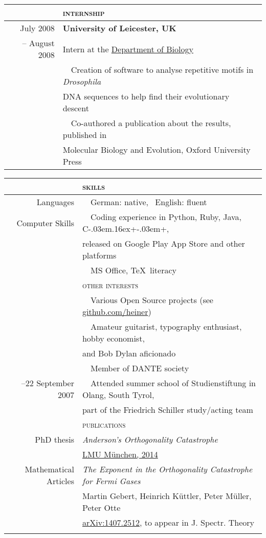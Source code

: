 \documentclass[11pt,english,a4paper]{memoir}
\newcommand{\red}{\color{Maroon}}
\newcommand{\header}[1]{%
  \addlinespace[2ex]
  & \large{\red\textsc{\MakeLowercase{#1}}} \tabularnewline
  \midrule}
\newcommand{\n}{\tabularnewline}
\newcommand{\bull}{\Pisymbol{MinionPro-Extra}{146}~~}
\newcommand{\nobull}{\phantom{\bull}}
\newcommand{\Cpp}{C\kern-.03em\raise.16ex\hbox{\small{+\kern-.03em+}}}
\begin{document}
\begin{center}
\begin{tabular}{rl}
  \n
  \header{Internship}
  July 2008       & \textbf{University of Leicester, UK} \n
  -- August 2008  & Intern at the \href{http://www.le.ac.uk/biology/phh4/}{Department of Biology} \n
  & \bull Creation of software to analyse repetitive motifs in
  \textit{Drosophila} \\
  & \nobull DNA sequences to help find their evolutionary descent \n
  & \bull Co-authored a publication about the results, published in \\
  & \nobull Molecular Biology and Evolution, Oxford University Press
\end{tabular}

\begin{tabular}{rl}
  \header{Skills}
  Languages & \bull German: native, \ English: fluent \n \addlinespace

  Computer Skills & \bull Coding experience in Python, Ruby, Java, \Cpp, \\
                  & \nobull released on Google Play App Store and other platforms \n
                  & \bull MS Office, \TeX\ literacy
  \n
  \header{Other interests}

  & \bull Various Open Source projects
  (see \href{https://github.com/heiner}{github.com/heiner}) \n
  & \bull Amateur guitarist, typography enthusiast,
  hobby economist,  \\
  & \nobull and Bob Dylan aficionado \n
  & \bull Member of DANTE society \n \addlinespace
  9--22 September 2007
  & \bull Attended summer school of Studienstiftung in Olang, South Tyrol, \\
  & \nobull part of the Friedrich Schiller study/acting team

  \n
  \header{Publications}
  PhD thesis & \textit{Anderson's Orthogonality Catastrophe} \\
  & \href{http://edoc.ub.uni-muenchen.de/17442/}{LMU München, 2014} \n \addlinespace

  Mathematical Articles
  & \textit{The Exponent in the Orthogonality Catastrophe for Fermi Gases} \\
  & Martin Gebert, Heinrich Küttler, Peter Müller, Peter Otte \\
  & \href{http://arxiv.org/abs/1407.2512}{arXiv:1407.2512}, to appear
  in J. Spectr. Theory \n \addlinespace


\end{tabular}
\end{center}
\end{document}
